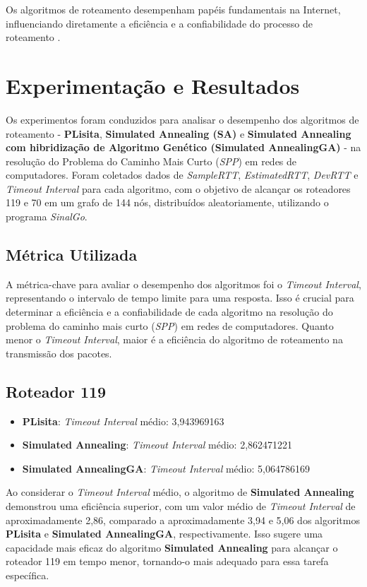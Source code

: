\documentclass[conference]{IEEEtran}
\begin{document}
Os algoritmos de roteamento desempenham papéis fundamentais na Internet, influenciando diretamente a eficiência e a confiabilidade do processo de roteamento \cite{KuroseRoss2010}.

\section{Experimentação e Resultados}

Os experimentos foram conduzidos para analisar o desempenho dos algoritmos de roteamento - \textbf{PLisita}, \textbf{Simulated Annealing (SA)} e \textbf{Simulated Annealing com hibridização de Algoritmo Genético (Simulated AnnealingGA)} - na resolução do Problema do Caminho Mais Curto (\textit{SPP}) em redes de computadores. Foram coletados dados de \textit{SampleRTT}, \textit{EstimatedRTT}, \textit{DevRTT} e \textit{Timeout Interval} para cada algoritmo, com o objetivo de alcançar os roteadores 119 e 70 em um grafo de 144 nós, distribuídos aleatoriamente, utilizando o programa \textit{SinalGo}.

\subsection{Métrica Utilizada}
A métrica-chave para avaliar o desempenho dos algoritmos foi o \textit{Timeout Interval}, representando o intervalo de tempo limite para uma resposta. Isso é crucial para determinar a eficiência e a confiabilidade de cada algoritmo na resolução do problema do caminho mais curto (\textit{SPP}) em redes de computadores. Quanto menor o \textit{Timeout Interval}, maior é a eficiência do algoritmo de roteamento na transmissão dos pacotes.

\subsection{Roteador 119}

\begin{itemize}
    \item \textbf{PLisita}: \textit{Timeout Interval} médio: 3,943969163
    \item \textbf{Simulated Annealing}: \textit{Timeout Interval} médio: 2,862471221
    \item \textbf{Simulated AnnealingGA}: \textit{Timeout Interval} médio: 5,064786169
\end{itemize}

Ao considerar o \textit{Timeout Interval} médio, o algoritmo de \textbf{Simulated Annealing} demonstrou uma eficiência superior, com um valor médio de \textit{Timeout Interval} de aproximadamente 2,86, comparado a aproximadamente 3,94 e 5,06 dos algoritmos \textbf{PLisita} e \textbf{Simulated AnnealingGA}, respectivamente. Isso sugere uma capacidade mais eficaz do algoritmo \textbf{Simulated Annealing} para alcançar o roteador 119 em tempo menor, tornando-o mais adequado para essa tarefa específica.
\end{document}
